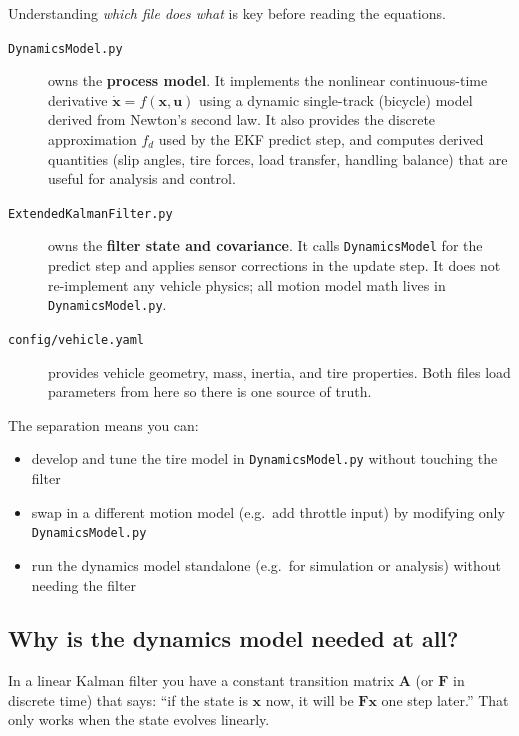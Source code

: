 \documentclass[11pt]{article}
\newcommand{\vect}[1]{\boldsymbol{#1}}
\newcommand{\mat}[1]{\mathbf{#1}}
\begin{document}
Understanding \emph{which file does what} is key before reading the equations.

\begin{description}
    \item[\texttt{DynamicsModel.py}] owns the \textbf{process model}.
        It implements the nonlinear continuous-time derivative
        $\dot{\vect{x}} = f(\vect{x}, \vect{u})$ using a dynamic single-track
        (bicycle) model derived from Newton's second law.  It also provides the
        discrete approximation $f_d$ used by the EKF predict step, and computes
        derived quantities (slip angles, tire forces, load transfer, handling
        balance) that are useful for analysis and control.

    \item[\texttt{ExtendedKalmanFilter.py}] owns the \textbf{filter state and
        covariance}.  It calls \texttt{DynamicsModel} for the predict step and
        applies sensor corrections in the update step.  It does not re-implement
        any vehicle physics; all motion model math lives in
        \texttt{DynamicsModel.py}.

    \item[\texttt{config/vehicle.yaml}] provides vehicle geometry, mass,
        inertia, and tire properties.  Both files load parameters from here so
        there is one source of truth.
\end{description}

The separation means you can:
\begin{itemize}
    \item develop and tune the tire model in \texttt{DynamicsModel.py} without
          touching the filter
    \item swap in a different motion model (e.g.\ add throttle input) by
          modifying only \texttt{DynamicsModel.py}
    \item run the dynamics model standalone (e.g.\ for simulation or analysis)
          without needing the filter
\end{itemize}

\subsection*{Why is the dynamics model needed at all?}

In a linear Kalman filter you have a constant transition matrix $\mat{A}$
(or $\mat{F}$ in discrete time) that says: ``if the state is $\vect{x}$ now,
it will be $\mat{F}\vect{x}$ one step later.''  That only works when the state
evolves linearly.
\end{document}
